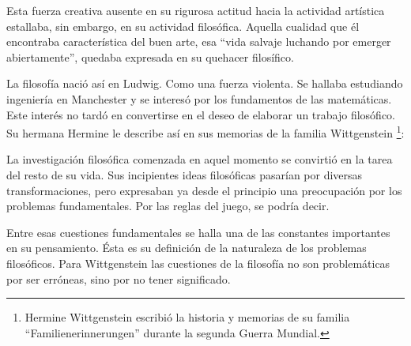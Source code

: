 Esta fuerza creativa ausente en su rigurosa actitud hacia la actividad artística
estallaba, sin embargo, en su actividad filosófica. Aquella cualidad que él
encontraba característica del buen arte, esa ``vida salvaje luchando por emerger
abiertamente'',\autocite[cf.˜][loc.˜]{monk} quedaba expresada en su quehacer
filosífico.

La filosofía nació así en Ludwig. Como una fuerza violenta. Se hallaba
estudiando ingeniería en Manchester y se interesó por los fundamentos de las
matemáticas. Este interés no tardó en convertirse en el deseo de elaborar un
trabajo filosófico. Su hermana Hermine le describe así en sus memorias de la
familia Wittgenstein
\footnote{Hermine Wittgenstein escribió la historia y memorias de su familia
  ``Familienerinnerungen'' durante la segunda Guerra Mundial.}:


La investigación filosófica comenzada en aquel momento se convirtió en la tarea
del resto de su vida. Sus incipientes ideas filosóficas pasarían por diversas
transformaciones, pero expresaban ya desde el principio una preocupación por los
problemas fundamentales. Por las reglas del juego, se podría decir.

Entre esas cuestiones fundamentales se halla una de las constantes importantes
en su pensamiento. Ésta es su definición de la naturaleza de los problemas
filosóficos. Para Wittgenstein las cuestiones de la filosofía no son
problemáticas por ser erróneas, sino por no tener
significado.\autocite[cf.~][4.003]{tractatus}

